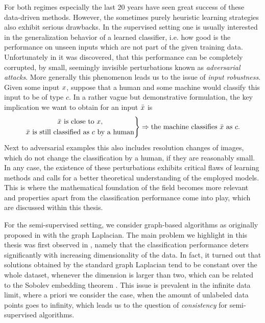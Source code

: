 For both regimes especially the last 20 years have seen great success of these data-driven methods. However, the sometimes purely heuristic learning strategies also exhibit serious drawbacks. In the supervised setting one is usually interested in the generalization behavior of a learned classifier, i.e. how good is the performance on unseen inputs which are not part of the given training data. Unfortunately in \cite{goodfellow2014explaining} it was discovered, that this performance can be completely corrupted, by small, seemingly invisible perturbations known as \textit{adversarial attacks}. More generally this phenomenon leads us to the issue of \textit{input robustness}. Given some input $x$, suppose that a human and some machine would classify this input to be of type $c$. In a rather vague but demonstrative formulation, the key implication we want to obtain for an input $\bar{x}$ is
%
\begin{align*}
\left.
\begin{gathered}
\bar{x}\text{ is close to }x,\\
\bar{x}\text{ is still classified as }c\text{ by a human}
\end{gathered}
\right\}
\Rightarrow
\text{the machine classifies }\bar{x}\text{ as } c. 
\end{align*}
%
Next to adversarial examples this also includes resolution changes of images, which do not change the classification by a human, if they are reasonably small. In any case, the existence of these perturbations exhibits critical flaws of learning methods and calls for a better theoretical understanding of the employed models. This is where the mathematical foundation of the field becomes more relevant and properties apart from the classification performance come into play, which are discussed within this thesis.

For the semi-supervised setting, we consider graph-based algorithms as originally proposed in \cite{zhu2003semi} with the graph Laplacian. The main problem we highlight in this thesis was first observed in \cite{nadler2009statistical}, namely that the classification performance deters significantly with increasing dimensionality of the data. In fact, it turned out that solutions obtained by the standard graph Laplacian tend to be constant over the whole dataset, whenever the dimension is larger than two, which can be related to the Sobolev embedding theorem \cite{adams2003sobolev}. This issue is prevalent in the infinite data limit, where a priori we consider the case, when the amount of unlabeled data points goes to infinity, which leads us to the question of \textit{consistency} for semi-supervised algorithms.

